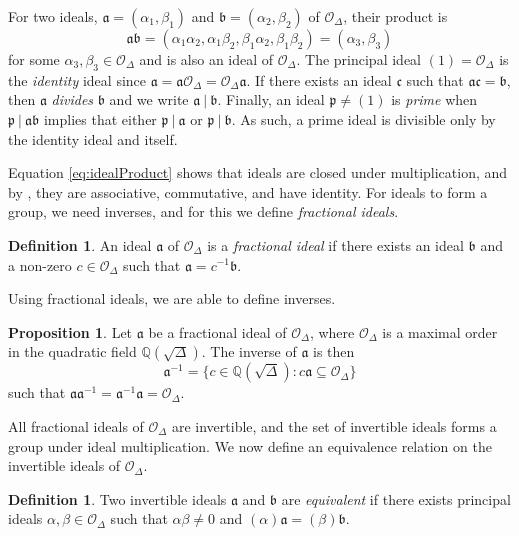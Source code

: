 \documentclass{ucalgthes1}
\theoremstyle{definition}
\newtheorem{prop}[thm]{Proposition}
\newtheorem{defn}[thm]{Definition}
\newcommand{\QQ}{\mathbb{Q}}
\newcommand{\OO}{\mathcal{O}}
\newcommand{\ideal}{\mathfrak}
\begin{document}
For two ideals, $\ideal a = (\alpha_1, \beta_1)$ and $\ideal b = (\alpha_2, \beta_2)$ of $\OO_\Delta$, their product is
\begin{equation}
	\ideal a \ideal b = (\alpha_1 \alpha_2, \alpha_1 \beta_2, \beta_1 \alpha_2, \beta_1 \beta_2) = (\alpha_3, \beta_3) \label{eq:idealProduct}
\end{equation}
for some $\alpha_3, \beta_3 \in \OO_\Delta$ and is also an ideal of $\OO_\Delta$. The principal ideal $(1) = \OO_\Delta$ is the \emph{identity} ideal since $\ideal a = \ideal a \OO_\Delta = \OO_\Delta \ideal a$.  If there exists an ideal $\ideal c$ such that $\ideal a \ideal c = \ideal b$, then $\ideal a$ \emph{divides} $\ideal b$ and we write $\ideal a ~|~ \ideal b$.  Finally, an ideal $\ideal p \neq (1)$ is \emph{prime} when $\ideal p ~|~ \ideal a \ideal b$ implies that either $\ideal p ~|~ \ideal a$ or $\ideal p ~|~ \ideal b$.  As such, a prime ideal is divisible only by the identity ideal and itself.

Equation \ref{eq:idealProduct} shows that ideals are closed under multiplication, and by \cite[p.117]{Cohn1980}, they are associative, commutative, and have identity.  For ideals to form a group, we need inverses, and for this we define \emph{fractional ideals}.

\begin{defn}
\cite[Definition 2.13]{Ramachandran2006} An ideal $\ideal a$ of $\OO_\Delta$ is a \emph{fractional ideal} if there exists an ideal $\ideal b$ and a non-zero $c \in \OO_\Delta$ such that $\ideal a = c^{-1} \ideal b$.
\end{defn}

Using fractional ideals, we are able to define inverses.

\begin{prop}
\cite[Proposition 2.14]{Ramachandran2006} Let $\ideal a$ be a fractional ideal of $\OO_\Delta$, where $\OO_\Delta$ is a maximal order in the quadratic field $\QQ(\sqrt \Delta)$.  The inverse of $\ideal a$ is then
\[
	\ideal a^{-1} = \{ c \in \QQ(\sqrt \Delta) : c \ideal a \subseteq \OO_\Delta \}
\]
such that $\ideal a \ideal a^{-1} = \ideal a^{-1} \ideal a = \OO_\Delta$.
\end{prop}

All fractional ideals of $\OO_\Delta$ are invertible, and the set of invertible ideals forms a group under ideal multiplication.  We now define an equivalence relation on the invertible ideals of $\OO_\Delta$.

\begin{defn}
\cite[p.88]{Jacobson2009} Two invertible ideals $\ideal a$ and $\ideal b$ are \emph{equivalent} if there exists principal ideals $\alpha, \beta \in \OO_\Delta$ such that $\alpha \beta \neq 0$ and $(\alpha)\ideal a = (\beta) \ideal b$.
\end{defn}
\end{document}
